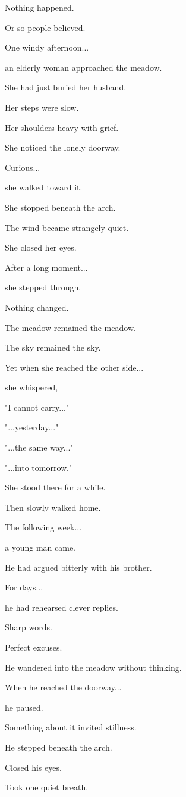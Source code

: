 \documentclass[12pt,openany]{book}
\begin{document}
Nothing happened.

Or so people believed.

One windy afternoon...

an elderly woman approached the meadow.

She had just buried her husband.

Her steps were slow.

Her shoulders heavy with grief.

She noticed the lonely doorway.

Curious...

she walked toward it.

She stopped beneath the arch.

The wind became strangely quiet.

She closed her eyes.

After a long moment...

she stepped through.

Nothing changed.

The meadow remained the meadow.

The sky remained the sky.

Yet when she reached the other side...

she whispered,

"I cannot carry..."

"...yesterday..."

"...the same way..."

"...into tomorrow."

She stood there for a while.

Then slowly walked home.

The following week...

a young man came.

He had argued bitterly with his brother.

For days...

he had rehearsed clever replies.

Sharp words.

Perfect excuses.

He wandered into the meadow without thinking.

When he reached the doorway...

he paused.

Something about it invited stillness.

He stepped beneath the arch.

Closed his eyes.

Took one quiet breath.
\end{document}
